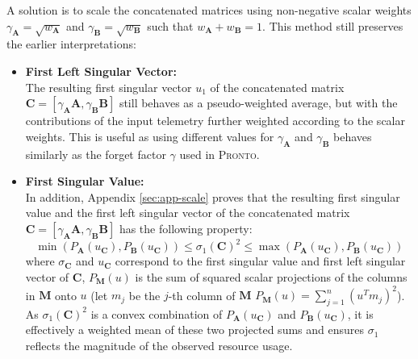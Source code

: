 A solution is to scale the concatenated matrices using non-negative scalar
weights $\gamma_{\mathbf{A}} = \sqrt{w_{\mathbf{A}}}$ and
$\gamma_{\mathbf{\mathbf{B}}} = \sqrt{w_{\mathbf{\mathbf{B}}}}$ such that
$w_{\mathbf{A}} + w_{\mathbf{\mathbf{B}}} = 1$. This method still preserves the
earlier interpretations:

\begin{itemize}
    \item \textbf{First Left Singular Vector:}\\
        The resulting first singular vector $u_1$ of the concatenated matrix $\mathbf{C} =
        [\gamma_{\mathbf{A}}\mathbf{A},
        \gamma_{\mathbf{\mathbf{B}}}\mathbf{\mathbf{B}}]$ still behaves as a
        pseudo-weighted average, but with the contributions of the input telemetry
        further weighted according to the scalar weights. This is useful as using
        different values for $\gamma_{\mathbf{A}}$ and $\gamma_{\mathbf{B}}$ behaves
        similarly as the forget factor $\gamma$ used in \textsc{Pronto}.
    \item \textbf{First Singular Value:}\\
        In addition, Appendix \ref{sec:app-scale} proves that the resulting first
        singular value and the first left singular vector of the concatenated matrix
        $\mathbf{C} = [\gamma_{\mathbf{A}}\mathbf{A},
        \gamma_{\mathbf{B}}\mathbf{B}]$ has the following property:
        \[ \min(P_{\mathbf{A}}(u_{\mathbf{C}}),P_{\mathbf{B}}(u_{\mathbf{C}}))
        \leq \sigma_1(\mathbf{C})^2 \leq
        \max(P_{\mathbf{A}}(u_{\mathbf{C}}),P_{\mathbf{B}}(u_{\mathbf{C}})) \]
        where $\sigma_{\mathbf{C}}$ and $u_{\mathbf{C}}$ correspond to the first
        singular value and first left singular vector of $\mathbf{C}$,
        $P_{\mathbf{M}}(u)$ is the sum of squared scalar projections of the
        columns in $\mathbf{M}$ onto $u$ (let $m_j$ be the $j$-th column of
        $\mathbf{M}$ $P_{\mathbf{M}}(u) = \sum_{j=1}^n (u^T m_j)^2$). As
        $\sigma_1(\mathbf{C})^2$ is a convex combination of
        $P_{\mathbf{A}}(u_{\mathbf{C}})$ and $P_{\mathbf{B}}(u_{\mathbf{C}})$,
        it is effectively a weighted mean of these two projected sums and
        ensures $\sigma_1$ reflects the magnitude of the observed resource
        usage.
\end{itemize}

